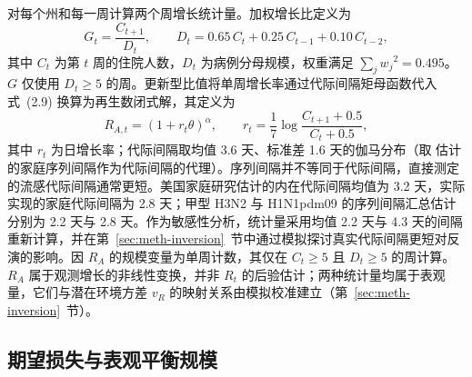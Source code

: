 对每个州和每一周计算两个周增长统计量。加权增长比定义为
\begin{equation}
  G_t=\frac{C_{t+1}}{D_t},\qquad D_t=0.65\,C_t+0.25\,C_{t-1}+0.10\,C_{t-2},
  \label{eq:dt}
\end{equation}
其中 $C_t$ 为第 $t$ 周的住院人数，$D_t$ 为病例分母规模，权重满足 $\sum_jw_j{}^2=0.495$。$G$ 仅使用 $D_t\ge5$ 的周。更新型比值将单周增长率通过代际间隔矩母函数代入 \citet{wallinga2007how} 式~(2.9) 换算为再生数闭式解，其定义为
\begin{equation}
  R_{A,t}=\left(1+r_t\theta\right)^{\alpha},\qquad r_t=\frac{1}{7}\log\frac{C_{t+1}+0.5}{C_t+0.5},
  \label{eq:ra}
\end{equation}
其中 $r_t$ 为日增长率；代际间隔取均值 3.6 天、标准差 1.6 天的伽马分布（取 \citet{cowling2009estimation} 估计的家庭序列间隔作为代际间隔的代理）。序列间隔并不等同于代际间隔，直接测定的流感代际间隔通常更短。美国家庭研究估计的内在代际间隔均值为 3.2 天，实际实现的家庭代际间隔为 2.8 天\citep{chan2025estimating}；甲型 H3N2 与 H1N1pdm09 的序列间隔汇总估计分别为 2.2 天与 2.8 天\citep{vink2014serial}。作为敏感性分析，统计量采用均值 2.2 天与 4.3 天的间隔重新计算，并在第~\ref{sec:meth-inversion}~节中通过模拟探讨真实代际间隔更短对反演的影响。因 $R_A$ 的规模变量为单周计数，其仅在 $C_t\ge5$ 且 $D_t\ge5$ 的周计算。$R_A$ 属于观测增长的非线性变换，并非 $R_t$ 的后验估计\citep{cori2013new}；两种统计量均属于表观量，它们与潜在环境方差 $v_R$ 的映射关系由模拟校准建立（第~\ref{sec:meth-inversion}~节）。

\subsection{期望损失与表观平衡规模}
\label{sec:meth-loss}

